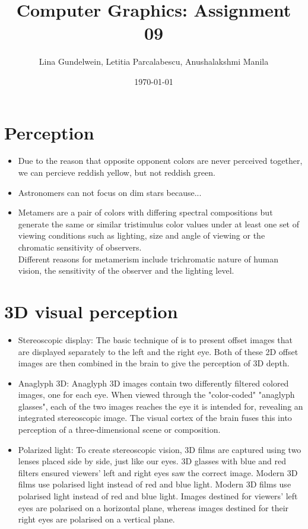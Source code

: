 \documentclass{article}
\title{Computer Graphics: Assignment 09} %
\author{Lina Gundelwein, Letitia Parcalabescu, Anushalakshmi Manila} %
\date{\today} %
\begin{document}
\maketitle 

\section{Perception}
\begin{itemize}
\item Due to the reason that opposite opponent colors are never perceived together, we can percieve reddish yellow, but not reddish green. 
\item Astronomers can not focus on dim stars because...

\item Metamers are a pair of colors with differing spectral compositions but generate the same or similar tristimulus color values under at least one set of viewing conditions such as lighting, size and angle of viewing or the chromatic sensitivity of observers. \\
Different reasons for metamerism include  trichromatic nature of human vision, the sensitivity of the observer and the lighting level.
\end{itemize}

\section{3D visual perception}
\begin{itemize}
	\item Stereoscopic display: The basic technique of is to present offset images that are displayed separately to the left and the right eye. Both of these 2D offset images are then combined in the brain to give the perception of 3D depth.
	
	\item Anaglyph 3D: Anaglyph 3D images contain two differently filtered colored images, one for each eye. When viewed through the "color-coded" "anaglyph glasses", each of the two images reaches the eye it is intended for, revealing an integrated stereoscopic image. The visual cortex of the brain fuses this into perception of a three-dimensional scene or composition.
	
	\item Polarized light: To create stereoscopic vision, 3D films are captured using two lenses placed side by side, just like our eyes. 3D glasses with blue and red filters ensured viewers’ left and right eyes saw the correct image. Modern 3D films use polarised light instead of red and blue light. Modern 3D films use polarised light instead of red and blue light.  Images destined for viewers' left eyes are polarised on a horizontal plane, whereas images destined for their right eyes are polarised on a vertical plane.
\end{itemize}
\end{document}
